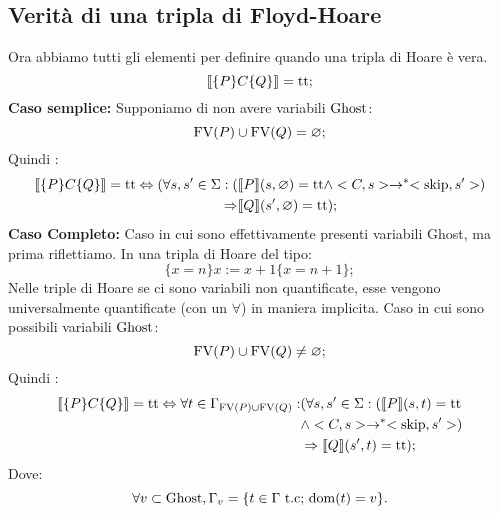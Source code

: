 \subsection{Verità di una tripla di Floyd-Hoare}
Ora abbiamo tutti gli elementi per definire quando una tripla di Hoare è vera.
\[
\llbracket \{P\}C\{Q\} \rrbracket = \mathrm{tt};
\]
\textbf{Caso semplice: }Supponiamo di non avere variabili $\mathrm{Ghost}$:
\[
\mathrm{FV}(P) \cup \mathrm{FV}(Q)= \varnothing;
\]
Quindi :
\begin{align*}
   \llbracket \{P\} C\{Q\} \rrbracket = \mathrm{tt} \Leftrightarrow (\forall s,s'\in \Sigma \mathrel{:}(
      &\llbracket P \rrbracket( s,\varnothing) = \mathrm{tt}\land <C,s>\rightarrow ^*<\mathrm{skip},s'>)\\
      \Rightarrow&\llbracket Q \rrbracket(s',\varnothing)=\mathrm{tt});
\end{align*}
\textbf{Caso Completo: }Caso in cui sono effettivamente presenti variabili Ghost, ma prima riflettiamo. In una tripla di Hoare del tipo:
\[
\{x=n\}x:=x+1\{x=n+1\};
\]
Nelle triple di Hoare se ci sono variabili non quantificate, esse vengono universalmente quantificate (con un $\forall$) in maniera implicita. Caso in cui sono possibili variabili $\mathrm{Ghost}$:
\[
\mathrm{FV}(P) \cup \mathrm{FV}(Q) \neq \varnothing;
\]
Quindi :
\begin{align*}
    \llbracket \{P\} C\{Q\} \rrbracket = \mathrm{tt} \Leftrightarrow \forall t \in \Gamma_{\mathrm{FV}(P)\cup \mathrm{FV}(Q)}\mathrel{:}
       &(\forall  s,s'\in \Sigma\mathrel{:}(\llbracket P \rrbracket(s,t) = \mathrm{tt}\\
       &\land <C,s>\rightarrow ^*<\mathrm{skip},s'>)\\
       &\Rightarrow\llbracket Q \rrbracket(s',t)=\mathrm{tt});
\end{align*}
Dove:
\[
\forall v \subset\mathrm{Ghost},\Gamma_{v} =\{t \in \Gamma \text{ t.c; $\mathop{\mathrm{dom}}\nolimits(t) =v$\}}.
\]
